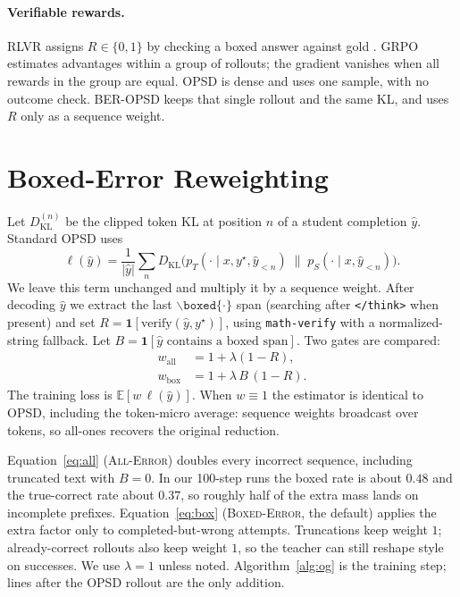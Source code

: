 \documentclass[letterpaper]{article}
\begin{document}
\paragraph{Verifiable rewards.}
RLVR assigns $R\in\{0,1\}$ by checking a boxed answer against gold \cite{cobbe2021gsm8k,shao2024deepseekmath}. GRPO estimates advantages within a group of rollouts; the gradient vanishes when all rewards in the group are equal. OPSD is dense and uses one sample, with no outcome check. BER-OPSD keeps that single rollout and the same KL, and uses $R$ only as a sequence weight.

\section{Boxed-Error Reweighting}

Let $D_{\mathrm{KL}}^{(n)}$ be the clipped token KL at position $n$ of a student completion $\hat y$. Standard OPSD uses
\begin{equation}
\ell(\hat y)=\frac{1}{|\hat y|}\sum_{n} D_{\mathrm{KL}}\!\big(p_T(\cdot\mid x,y^\star,\hat y_{<n})\;\|\;p_S(\cdot\mid x,\hat y_{<n})\big).
\end{equation}
We leave this term unchanged and multiply it by a sequence weight. After decoding $\hat y$ we extract the last $\backslash\texttt{boxed}\{\cdot\}$ span (searching after \texttt{</think>} when present) and set $R=\mathbf{1}[\mathrm{verify}(\hat y,y^\star)]$, using \texttt{math-verify} with a normalized-string fallback. Let $B=\mathbf{1}[\hat y\text{ contains a boxed span}]$. Two gates are compared:
\begin{align}
w_{\mathrm{all}} &= 1+\lambda(1-R), \label{eq:all}\\
w_{\mathrm{box}} &= 1+\lambda\, B\,(1-R). \label{eq:box}
\end{align}
The training loss is $\mathbb{E}[w\,\ell(\hat y)]$. When $w\equiv 1$ the estimator is identical to OPSD, including the token-micro average: sequence weights broadcast over tokens, so all-ones recovers the original reduction.

Equation~\eqref{eq:all} (\textsc{All-Error}) doubles every incorrect sequence, including truncated text with $B{=}0$. In our 100-step runs the boxed rate is about $0.48$ and the true-correct rate about $0.37$, so roughly half of the extra mass lands on incomplete prefixes. Equation~\eqref{eq:box} (\textsc{Boxed-Error}, the default) applies the extra factor only to completed-but-wrong attempts. Truncations keep weight $1$; already-correct rollouts also keep weight $1$, so the teacher can still reshape style on successes. We use $\lambda{=}1$ unless noted. Algorithm~\ref{alg:og} is the training step; lines after the OPSD rollout are the only addition.
\end{document}
